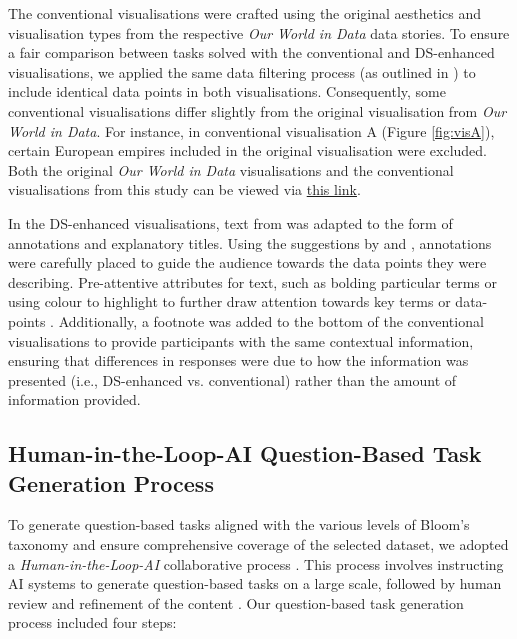 The conventional visualisations were crafted using the original aesthetics and visualisation types from the respective \textit{Our World in Data} data stories. To ensure a fair comparison between tasks solved with the conventional and DS-enhanced visualisations, we applied the same data filtering process (as outlined in \citet{zdanovic2022influence}) to include identical data points in both visualisations. Consequently, some conventional visualisations differ slightly from the original visualisation from \textit{Our World in Data}. For instance, in conventional visualisation A (Figure \ref{fig:visA}), certain European empires included in the original visualisation were excluded. Both the original \textit{Our World in Data} visualisations and the conventional visualisations from this study can be viewed via \href{https://github.com/mmilesi45/DataStorytelling-ComplexTasks/blob/main/1.%20Visualisations/visualisations.pdf}{this link}.

In the DS-enhanced visualisations, text from \citet{herre2023statecap} was adapted to the form of annotations and explanatory titles. Using the suggestions by \citet{kim2021towards} and \citet{stokes2023striking}, annotations were carefully placed to guide the audience towards the data points they were describing. Pre-attentive attributes for text, such as bolding particular terms or using colour to highlight to further draw attention towards key terms or data-points \cite{knaflic2015storytelling}. Additionally, a footnote was added to the bottom of the conventional visualisations to provide participants with the same contextual information, ensuring that differences in responses were due to how the information was presented (i.e., DS-enhanced vs. conventional) rather than the amount of information provided.

\subsection{Human-in-the-Loop-AI Question-Based Task Generation Process}
To generate question-based tasks aligned with the various levels of Bloom's taxonomy and ensure comprehensive coverage of the selected dataset, we adopted a \textit{Human-in-the-Loop-AI} collaborative process \cite{hao2024transforming}. This process involves instructing AI systems to generate question-based tasks on a large scale, followed by human review and refinement of the content \cite{hao2024transforming, attali2022interactive, zu2023automated}. Our question-based task generation process included four steps: 

